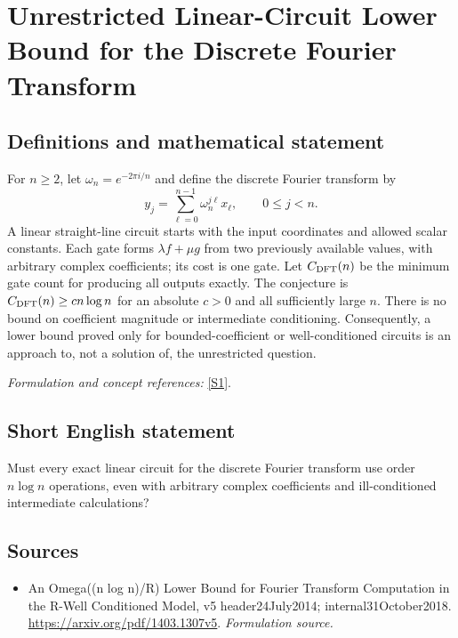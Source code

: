 \documentclass[11pt]{article}
\begin{document}
\section*{\texorpdfstring{Unrestricted Linear-Circuit Lower Bound for the Discrete Fourier Transform}{Unrestricted Linear-Circuit Lower Bound for the Discrete Fourier Transform}}\label{30006850}
\subsection{Definitions and mathematical statement}
For $n\ge2$, let $\omega_n=e^{-2\pi i/n}$ and define the discrete Fourier transform by
\[
 y_j=\sum_{\ell=0}^{n-1}\omega_n^{j\ell}x_\ell,
 \qquad0\le j<n.
\]
A linear straight-line circuit starts with the input coordinates and allowed scalar constants. Each gate forms $\lambda f+\mu g$ from two previously available values, with arbitrary complex coefficients; its cost is one gate. Let $C_{\rm DFT}(n)$ be the minimum gate count for producing all outputs exactly. The conjecture is $C_{\rm DFT}(n)\ge c n\log n$ for an absolute $c>0$ and all sufficiently large $n$. There is no bound on coefficient magnitude or intermediate conditioning. Consequently, a lower bound proved only for bounded-coefficient or well-conditioned circuits is an approach to, not a solution of, the unrestricted question.
\par\smallskip\textit{Formulation and concept references:} \href{https://arxiv.org/pdf/1403.1307v5}{[S1]}.

\subsection{Short English statement}
Must every exact linear circuit for the discrete Fourier transform use order $n\log n$ operations, even with arbitrary complex coefficients and ill-conditioned intermediate calculations?
\subsection{Sources}
\begin{itemize}
\item[S1]An Omega((n log n)/R) Lower Bound for Fourier Transform Computation in the R-Well Conditioned Model, v5 header24July2014; internal31October2018.
\url{https://arxiv.org/pdf/1403.1307v5}.
\textit{Formulation source.}
\end{itemize}
\end{document}
